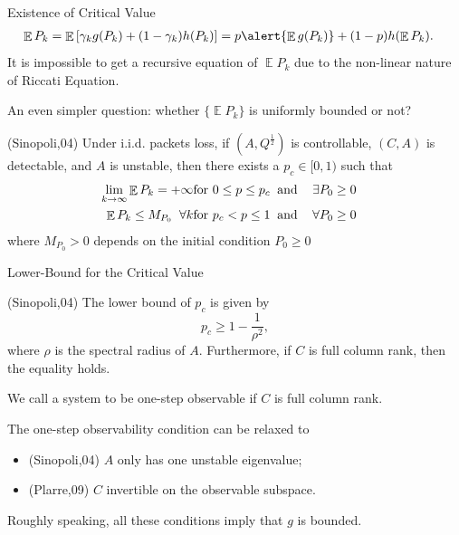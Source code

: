 \documentclass[10pt]{beamer}
\DeclareMathOperator{\1}{\textbf{1}}
\DeclareMathOperator{\E}{\mathbb E}
\begin{document}
  \begin{frame}{Existence of Critical Value}
    \begin{displaymath}
      \begin{split}
	\E P_k &= \E\left[\gamma_k g(P_k) + (1-\gamma_k) h(P_k)\right]= p\alert{\E g(P_k)} + (1-p) h(\E P_k).
      \end{split}
    \end{displaymath}
    It is impossible to get a recursive equation of $\E P_k$ due to the non-linear nature of Riccati Equation. 

    An even simpler question: whether $\{\E P_k\}$ is uniformly bounded or not?
    \begin{theorem}
      (Sinopoli,04) Under i.i.d. packets loss, if $(A,Q^{\frac{1}{2}})$ is controllable, $(C,A)$ is detectable, and $A$ is unstable, then there exists a $p_c\in[0,1)$ such that
      \begin{eqnarray}\label{eqn:lambdaCrit}
	\lim_{k\rightarrow\infty}\E P_k=+\infty & \mbox{for } 0\leq
	p \leq p_c \; \;
	\mbox{and  \hspace{3mm}$\exists P_0 \geq 0$}&\\
	\E P_k \leq M_{P_0} \;\; \forall k & \mbox{for } p_c <
	p \leq 1 \; \; \mbox{and \hspace{3mm}$\forall P_0 \geq 0$}&
      \end{eqnarray}
      where $M_{P_0} > 0 $  depends on the initial condition $P_0 \geq 0$
    \end{theorem}
  \end{frame}

  \begin{frame}{Lower-Bound for the Critical Value}
    \begin{theorem}
      (Sinopoli,04) The lower bound of $p_c$ is given by
      \begin{displaymath}
	p_c \geq 1-\frac{1}{\rho^2}, 
      \end{displaymath}
      where $\rho$ is the spectral radius of $A$. Furthermore, if $C$ is full column rank, then the equality holds.
    \end{theorem}
    We call a system to be one-step observable if $C$ is full column rank.

    The one-step observability condition can be relaxed to
    \begin{itemize}
      \item (Sinopoli,04) $A$ only has one unstable eigenvalue;
      \item (Plarre,09) $C$ invertible on the observable subspace.
    \end{itemize}
    Roughly speaking, all these conditions imply that $g$ is bounded.
  \end{frame}
\end{document}
